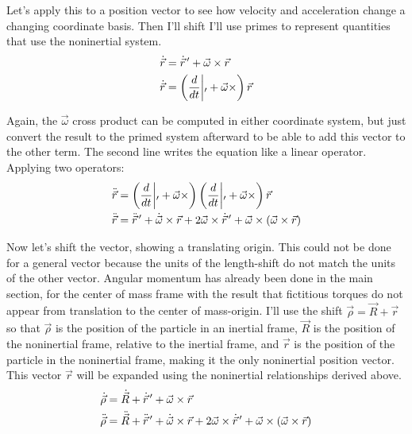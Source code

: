 \documentclass[10pt]{article}
\begin{document}
Let's apply this to a position vector to see how velocity and acceleration 
change a changing coordinate basis. Then I'll shift
I'll use primes to represent quantities that use the noninertial system.
\begin{align}
    \dot{\vec{r}} &= \dot{\vec{r}}^{\,\prime} 
        + \vec{\omega}\times\vec{r} \notag\\
    \dot{\vec{r}} 
        &= \left(\frac{d}{dt}\middle|_\prime + \vec{\omega}\times\right)\vec{r}
\end{align}

Again, the $\vec{\omega}$ cross product can be computed in 
either coordinate system, but just convert the result to the 
primed system afterward to be able to add this vector to the other 
term. The second line writes the equation like a linear operator. 
Applying two operators:
\begin{align}
    \ddot{\vec{r}}
        &= \left(\frac{d}{dt}\middle|_\prime + \vec{\omega}\times\right)
        \left(\frac{d}{dt}\middle|_\prime + \vec{\omega}\times\right)\vec{r} 
        \notag\\
    \ddot{\vec{r}} 
        &= \ddot{\vec{r}}^{\,\prime} + \dot{\vec{\omega}}\times\vec{r} + 
        2\vec{\omega}\times\dot{\vec{r}}^{\,\prime} + 
        \vec{\omega}\times(\vec{\omega}\times\vec{r})
\end{align}

Now let's shift the vector, showing a translating origin. This could not 
be done for a general vector because the units of the length-shift do not 
match the units of the other vector. Angular momentum has already been done 
in the main section, for the center of mass frame with the result that 
fictitious torques do not appear from translation to the center of mass-origin.
I'll use the shift $\vec{\rho}=\vec{R}+\vec{r}$ so that $\vec{\rho}$ is the 
position of the particle in an inertial frame, $\vec{R}$ is the 
position of the noninertial frame, relative to the inertial frame, and 
$\vec{r}$ is the position of the particle in the noninertial frame, making 
it the only noninertial position vector. This vector $\vec{r}$
 will be expanded using the noninertial relationships derived above.
\begin{align}
    \dot{\vec{\rho}} &= \dot{\vec{R}} + \dot{\vec{r}}^{\,\prime}
        +\vec{\omega}\times\vec{r} \notag\\
    \ddot{\vec{\rho}} 
        &= \ddot{\vec{R}} + \ddot{\vec{r}}^{\,\prime} +
        \dot{\vec{\omega}}\times\vec{r} + 
        2\vec{\omega}\times\dot{\vec{r}}^{\,\prime} + 
        \vec{\omega}\times(\vec{\omega}\times\vec{r})
\end{align}
\end{document}
